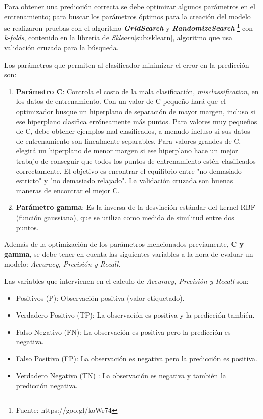 Para obtener una predicción  correcta se debe optimizar algunos parámetros en el entrenamiento; para buscar los parámetros óptimos para la creación del modelo se realizaron pruebas con el algoritmo  \textit{\textbf{GridSearch}} y \textit{\textbf{RandomizeSearch}} \footnote{Fuente: https://goo.gl/koWr74} con \textit{k-folds}, contenido en la librería de \textit{Sklearn}\ref{sub:sklearn}, algoritmo que usa validación cruzada para la búsqueda. 


Los parámetros que permiten al clasificador minimizar el error en la predicción  son:
\begin{enumerate}
	\item \textbf{Parámetro C}: Controla el costo de la mala clasificación, \textit{misclassification}, en los datos de entrenamiento. Con un valor de C pequeño hará que el optimizador busque un hiperplano de separación de mayor margen, incluso si ese hiperplano clasifica erróneamente más puntos. Para valores muy pequeños de C, debe obtener ejemplos mal clasificados, a menudo incluso si sus datos de entrenamiento son linealmente separables. Para valores grandes de C,  elegirá un hiperplano de menor margen si ese hiperplano hace un mejor trabajo de conseguir que todos los puntos de entrenamiento estén clasificados correctamente. El objetivo es encontrar el equilibrio entre "no demasiado estricto" y "no demasiado relajado". La validación cruzada  son buenas maneras de encontrar el mejor C.

	\item \textbf{Parámetro gamma}: Es la inversa de la desviación estándar del kernel RBF (función gaussiana), que se utiliza como medida de similitud entre dos puntos. 
\end{enumerate}

Además de la optimización de los parámetros mencionados previamente, \textbf{C y gamma}, se  debe tener en cuenta las siguientes variables a la hora de evaluar un modelo: \textit{Accuracy, Precisión y Recall}. 

Las variables que intervienen en el calculo de \textit{Accuracy, Precisión y Recall} son:
\begin{itemize}
	\item Positivos (P): Observación positiva (valor etiquetado).
	\item Verdadero Positivo (TP): La observación es positiva y la predicción también.
	\item Falso Negativo (FN): La observación es positiva pero la predicción es negativa.
	\item Falso Positivo (FP): La observación es negativa pero la predicción es positiva.
	\item Verdadero Negativo (TN) :  La observación es negativa y también la predicción negativa.
\end{itemize}

